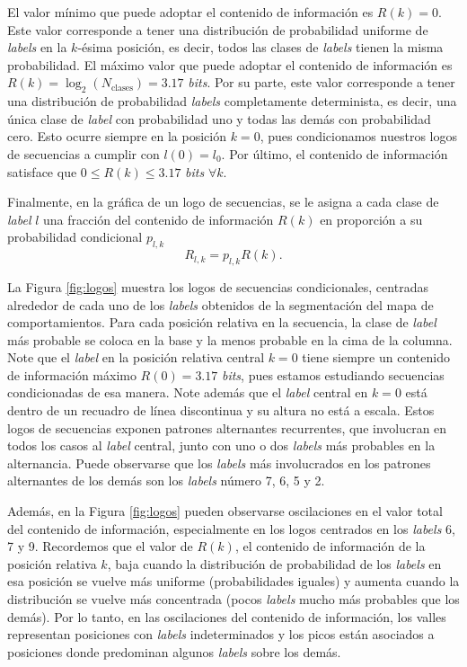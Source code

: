 El valor mínimo que puede adoptar el contenido de información es $R(k) = 0$. Este valor corresponde a tener una distribución de probabilidad uniforme de \textit{labels} en la $k$-ésima posición, es decir, todos las clases de \textit{labels} tienen la misma probabilidad. El máximo valor que puede adoptar el contenido de información es $R(k) = \log_2(N_{\mathrm{clases}}) = 3.17$ \textit{bits}. Por su parte, este valor corresponde a tener una distribución de probabilidad \textit{labels} completamente determinista, es decir, una única clase de \textit{label} con probabilidad uno y todas las demás con probabilidad cero. Esto ocurre siempre en la posición $k=0$, pues condicionamos nuestros logos de secuencias a cumplir con $l(0) = l_0$. Por último, el contenido de información satisface que $0 \leq R(k) \leq 3.17$ \textit{bits} $\forall k$.

Finalmente, en la gráfica de un logo de secuencias, se le asigna a cada clase de \textit{label} $l$ una fracción del contenido de información $R(k)$ en proporción a su probabilidad condicional $p_{l,k}$
\begin{equation}
    R_{l,k} = p_{l,k} R(k).
\end{equation}

La Figura \ref{fig:logos} muestra los logos de secuencias condicionales, centradas alrededor de cada uno de los \textit{labels} obtenidos de la segmentación del mapa de comportamientos. Para cada posición relativa en la secuencia, la clase de \textit{label} más probable se coloca en la base y la menos probable en la cima de la columna. Note que el \textit{label} en la posición relativa central $k=0$ tiene siempre un contenido de información máximo $R(0) = 3.17$ \textit{bits}, pues estamos estudiando secuencias condicionadas de esa manera. Note además que el \textit{label} central en $k=0$ está dentro de un recuadro de línea discontinua y su altura no está a escala. Estos logos de secuencias exponen patrones alternantes recurrentes, que involucran en todos los casos al \textit{label} central, junto con uno o dos \textit{labels} más probables en la alternancia. Puede observarse que los \textit{labels} más involucrados en los patrones alternantes de los demás son los \textit{labels} número 7, 6, 5 y 2.

Además, en la Figura \ref{fig:logos} pueden observarse oscilaciones en el valor total del contenido de información, especialmente en los logos centrados en los \textit{labels} 6, 7 y 9. Recordemos que el valor de $R(k)$, el contenido de información de la posición relativa $k$, baja cuando la distribución de probabilidad de los \textit{labels} en esa posición se vuelve más uniforme (probabilidades iguales) y aumenta cuando la distribución se vuelve más concentrada (pocos \textit{labels} mucho más probables que los demás). Por lo tanto, en las oscilaciones del contenido de información, los valles representan posiciones con \textit{labels} indeterminados y los picos están asociados a posiciones donde predominan algunos \textit{labels} sobre los demás.

